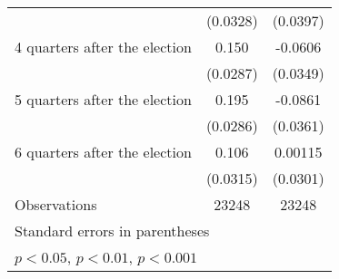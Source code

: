 \begin{table}[htbp]
\begin{tabular}{l*{2}{c}}
                    &    (0.0328)         &    (0.0397)         \\
[1em]
 4 quarters after the election&       0.150\sym{***}&     -0.0606         \\
                    &    (0.0287)         &    (0.0349)         \\
[1em]
 5 quarters after the election&       0.195\sym{***}&     -0.0861\sym{*}  \\
                    &    (0.0286)         &    (0.0361)         \\
[1em]
 6 quarters after the election&       0.106\sym{***}&     0.00115         \\
                    &    (0.0315)         &    (0.0301)         \\
\hline
Observations        &       23248         &       23248         \\
\hline\hline
\multicolumn{3}{l}{\footnotesize Standard errors in parentheses}\\
\multicolumn{3}{l}{\footnotesize \sym{*} \(p<0.05\), \sym{**} \(p<0.01\), \sym{***} \(p<0.001\)}\\
\end{tabular}
\end{table}
